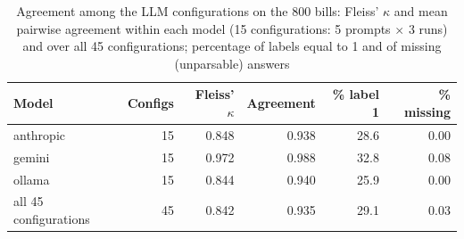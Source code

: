 \begin{table}[htbp]
\centering
\footnotesize
\setlength{\tabcolsep}{4pt}
\caption{Agreement among the LLM configurations on the 800 bills: Fleiss' $\kappa$ and mean pairwise agreement within each model (15 configurations: 5 prompts $\times$ 3 runs) and over all 45 configurations; percentage of labels equal to 1 and of missing (unparsable) answers}\label{tab:agreement}
\begin{tabular}{lrrrrr}
\toprule
Model & Configs & Fleiss' $\kappa$ & Agreement & \% label 1 & \% missing \\
\midrule
anthropic & 15 & 0.848 & 0.938 & 28.6 & 0.00 \\
gemini & 15 & 0.972 & 0.988 & 32.8 & 0.08 \\
ollama & 15 & 0.844 & 0.940 & 25.9 & 0.00 \\
all 45 configurations & 45 & 0.842 & 0.935 & 29.1 & 0.03 \\
\bottomrule
\end{tabular}
\end{table}
